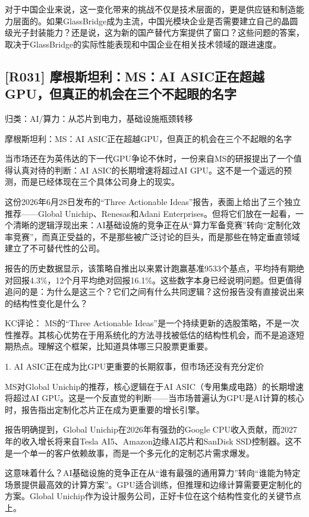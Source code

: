 \documentclass[11pt]{ctexart}
\begin{document}
对于中国企业来说，这一变化带来的挑战不仅是技术层面的，更是供应链和制造能力层面的。如果GlassBridge成为主流，中国光模块企业是否需要建立自己的晶圆级光子封装能力？还是说，这为新的国产替代方案提供了窗口？这些问题的答案，取决于GlassBridge的实际性能表现和中国企业在相关技术领域的跟进速度。

\subsection{[R031] 摩根斯坦利：MS：AI ASIC正在超越GPU，但真正的机会在三个不起眼的名字}
{\small\color{refgray}归类：AI/算力：从芯片到电力，基础设施瓶颈转移}

摩根斯坦利：MS：AI ASIC正在超越GPU，但真正的机会在三个不起眼的名字

当市场还在为英伟达的下一代GPU争论不休时，一份来自MS的研报提出了一个值得认真对待的判断：AI ASIC的长期增速将超过AI GPU。这不是一个遥远的预测，而是已经体现在三个具体公司身上的现实。

这份2026年6月28日发布的“Three Actionable Ideas”报告，表面上给出了三个独立推荐——Global Unichip、Renesas和Adani Enterprises。但将它们放在一起看，一个清晰的逻辑浮现出来：AI基础设施的竞争正在从“算力军备竞赛”转向“定制化效率竞赛”，而真正受益的，不是那些被广泛讨论的巨头，而是那些在特定垂直领域建立了不可替代性的公司。

报告的历史数据显示，该策略自推出以来累计跑赢基准9533个基点，平均持有期绝对回报4.3\%，12个月平均绝对回报16.1\%。这些数字本身已经说明问题。但更值得追问的是：为什么是这三个？它们之间有什么共同逻辑？这份报告没有直接说出来的结构性变化是什么？

KC评论： MS的“Three Actionable Ideas”是一个持续更新的选股策略，不是一次性推荐。其核心优势在于用系统化的方法寻找被低估的结构性机会，而不是追逐短期热点。理解这个框架，比知道具体哪三只股票更重要。

1. AI ASIC正在成为比GPU更重要的长期叙事，但市场还没有充分定价

MS对Global Unichip的推荐，核心逻辑在于AI ASIC（专用集成电路）的长期增速将超过AI GPU。这是一个反直觉的判断——当市场普遍认为GPU是AI计算的核心时，报告指出定制化芯片正在成为更重要的增长引擎。

报告明确提到，Global Unichip在2026年有强劲的Google CPU收入贡献，而2027年的收入增长将来自Tesla AI5、Amazon边缘AI芯片和SanDisk SSD控制器。这不是一个单一的客户依赖故事，而是一个多元化的定制芯片需求爆发。

这意味着什么？AI基础设施的竞争正在从“谁有最强的通用算力”转向“谁能为特定场景提供最高效的计算方案”。GPU适合训练，但推理和边缘计算需要更定制化的方案。Global Unichip作为设计服务公司，正好卡位在这个结构性变化的关键节点上。
\end{document}
